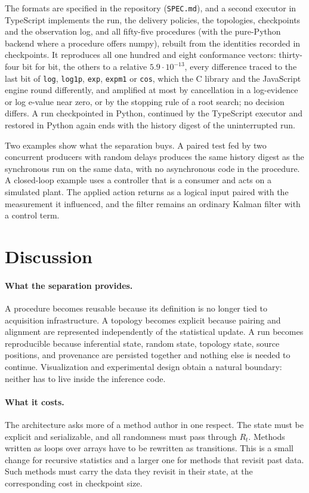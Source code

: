 \documentclass[11pt,a4paper]{article}
\theoremstyle{definition}
\theoremstyle{remark}
\newcommand{\code}[1]{\texttt{#1}}
\begin{document}
The formats are specified in the repository (\code{SPEC.md}), and a
second executor in TypeScript implements the run, the delivery policies,
the topologies, checkpoints and the observation log, and all
fifty-five procedures (with the pure-Python backend where a procedure
offers numpy), rebuilt from the identities recorded in checkpoints. It
reproduces all one hundred and eight conformance vectors: thirty-four bit for bit,
the others to a relative $5.9\cdot 10^{-13}$, every difference traced to
the last bit of \code{log}, \code{log1p}, \code{exp}, \code{expm1} or \code{cos},
which the C library and the JavaScript engine round differently, and
amplified at most by cancellation in a log-evidence or log e-value near zero, or by the stopping
rule of a root search; no decision differs. A run checkpointed in Python, continued by the TypeScript
executor and restored in Python again ends with the history digest of
the uninterrupted run.

Two examples show what the separation buys. A paired test fed by two
concurrent producers with random delays produces the same history
digest as the synchronous run on the same data, with no asynchronous
code in the procedure. A closed-loop example uses a controller that
is a consumer and acts on a simulated plant. The applied action returns
as a logical input paired with the measurement it influenced, and the
filter remains an ordinary Kalman filter with a control term.

\section{Discussion}
\label{sec:discussion}

\paragraph{What the separation provides.}
A procedure becomes reusable because its definition is no longer tied
to acquisition infrastructure. A topology becomes explicit because
pairing and alignment are represented independently of the statistical
update. A run becomes reproducible because inferential state, random
state, topology state, source positions, and provenance are persisted
together and nothing else is needed to continue. Visualization and
experimental design obtain a natural boundary: neither has to live
inside the inference code.

\paragraph{What it costs.}
The architecture asks more of a method author in one respect. The state
must be explicit and serializable, and all randomness must pass through
$R_t$. Methods written as loops over arrays have to be rewritten as
transitions. This is a small change for recursive statistics and a
larger one for methods that revisit past data. Such
methods must carry the data they revisit in their state, at the
corresponding cost in checkpoint size.
\end{document}
